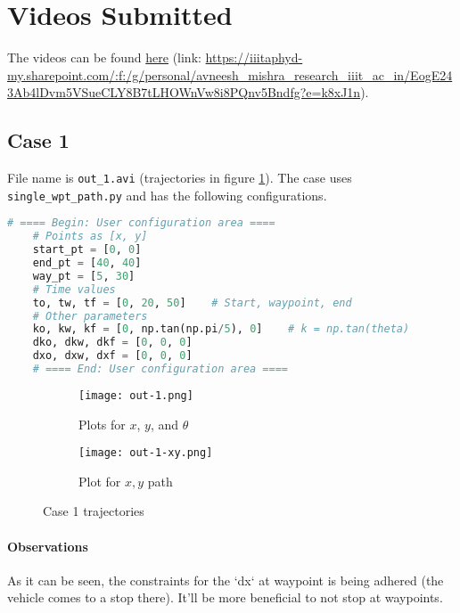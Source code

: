 \section{Videos Submitted}

The videos can be found \href{https://iiitaphyd-my.sharepoint.com/:f:/g/personal/avneesh_mishra_research_iiit_ac_in/EogE243Ab4lDvm5VSueCLY8B7tLHOWnVw8i8PQnv5Bndfg?e=k8xJ1n}{here} (link: \url{https://iiitaphyd-my.sharepoint.com/:f:/g/personal/avneesh_mishra_research_iiit_ac_in/EogE243Ab4lDvm5VSueCLY8B7tLHOWnVw8i8PQnv5Bndfg?e=k8xJ1n}).

\subsection{Case 1}

File name is \texttt{out\_1.avi} (trajectories in figure \ref{fig:case-1-traj}). The case uses \texttt{single\_wpt\_path.py} and has the following configurations.

\begin{lstlisting}[language=Python, numbers=none]
    # ==== Begin: User configuration area ====
    # Points as [x, y]
    start_pt = [0, 0]
    end_pt = [40, 40]
    way_pt = [5, 30]
    # Time values
    to, tw, tf = [0, 20, 50]    # Start, waypoint, end
    # Other parameters
    ko, kw, kf = [0, np.tan(np.pi/5), 0]    # k = np.tan(theta)
    dko, dkw, dkf = [0, 0, 0]
    dxo, dxw, dxf = [0, 0, 0]
    # ==== End: User configuration area ====
\end{lstlisting}

\begin{figure}[ht]
    \centering
    \begin{subfigure}[b]{0.3\textwidth}
        \texttt{[image: out-1.png]}
        \caption{Plots for $x$, $y$, and $\theta$}
    \end{subfigure}
    \begin{subfigure}[b]{0.6\textwidth}
        \texttt{[image: out-1-xy.png]}
        \caption{Plot for $x, y$ path}
    \end{subfigure}
    \caption{Case 1 trajectories}
    \label{fig:case-1-traj}
\end{figure}

\paragraph*{Observations}
As it can be seen, the constraints for the `dx` at waypoint is being adhered (the vehicle comes to a stop there). It'll be more beneficial to not stop at waypoints.

